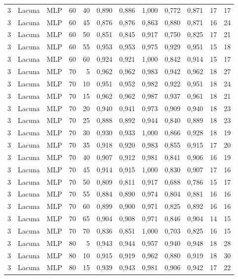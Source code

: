 \begin{longtable}{@{}rllrrrrrrrrr@{}}
3 & Lacuna & MLP & 60 & 40 & 0,890 & 0,886 & 1,000 & 0,772 & 0,871 & 17 & 17 \\
3 & Lacuna & MLP & 60 & 45 & 0,876 & 0,876 & 0,863 & 0,880 & 0,871 & 16 & 24 \\
3 & Lacuna & MLP & 60 & 50 & 0,851 & 0,845 & 0,917 & 0,750 & 0,825 & 17 & 21 \\
3 & Lacuna & MLP & 60 & 55 & 0,953 & 0,953 & 0,975 & 0,929 & 0,951 & 15 & 18 \\
3 & Lacuna & MLP & 60 & 60 & 0,924 & 0,921 & 1,000 & 0,842 & 0,914 & 15 & 17 \\
3 & Lacuna & MLP & 70 & 5 & 0,962 & 0,962 & 0,983 & 0,942 & 0,962 & 18 & 27 \\
3 & Lacuna & MLP & 70 & 10 & 0,951 & 0,952 & 0,982 & 0,922 & 0,951 & 18 & 24 \\
3 & Lacuna & MLP & 70 & 15 & 0,962 & 0,962 & 0,987 & 0,937 & 0,961 & 18 & 21 \\
3 & Lacuna & MLP & 70 & 20 & 0,940 & 0,941 & 0,973 & 0,909 & 0,940 & 18 & 23 \\
3 & Lacuna & MLP & 70 & 25 & 0,888 & 0,892 & 0,944 & 0,840 & 0,889 & 18 & 23 \\
3 & Lacuna & MLP & 70 & 30 & 0,930 & 0,933 & 1,000 & 0,866 & 0,928 & 18 & 19 \\
3 & Lacuna & MLP & 70 & 35 & 0,918 & 0,920 & 0,983 & 0,855 & 0,915 & 17 & 20 \\
3 & Lacuna & MLP & 70 & 40 & 0,907 & 0,912 & 0,981 & 0,841 & 0,906 & 16 & 19 \\
3 & Lacuna & MLP & 70 & 45 & 0,914 & 0,915 & 1,000 & 0,830 & 0,907 & 17 & 16 \\
3 & Lacuna & MLP & 70 & 50 & 0,809 & 0,811 & 0,917 & 0,688 & 0,786 & 15 & 17 \\
3 & Lacuna & MLP & 70 & 55 & 0,884 & 0,890 & 0,974 & 0,804 & 0,881 & 16 & 16 \\
3 & Lacuna & MLP & 70 & 60 & 0,899 & 0,900 & 0,971 & 0,825 & 0,892 & 16 & 16 \\
3 & Lacuna & MLP & 70 & 65 & 0,904 & 0,908 & 0,971 & 0,846 & 0,904 & 14 & 15 \\
3 & Lacuna & MLP & 70 & 70 & 0,836 & 0,851 & 1,000 & 0,703 & 0,825 & 16 & 15 \\
3 & Lacuna & MLP & 80 & 5 & 0,943 & 0,944 & 0,957 & 0,940 & 0,948 & 18 & 28 \\
3 & Lacuna & MLP & 80 & 10 & 0,915 & 0,919 & 0,962 & 0,880 & 0,919 & 18 & 30 \\
3 & Lacuna & MLP & 80 & 15 & 0,939 & 0,943 & 0,981 & 0,906 & 0,942 & 17 & 22 \\

\end{longtable}
